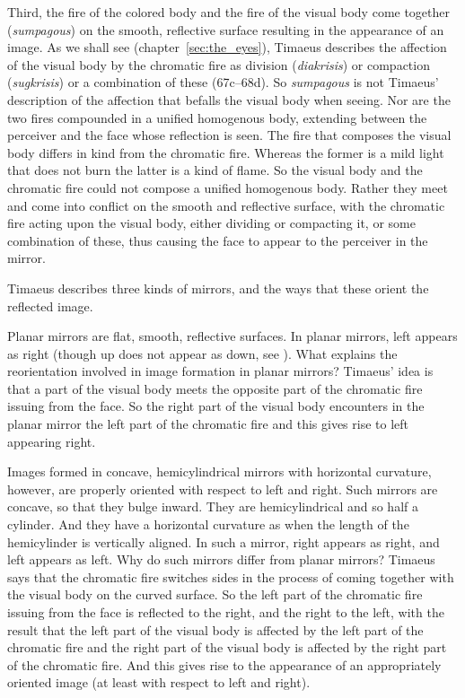 Third, the fire of the colored body and the fire of the visual body come together (\emph{sumpagous}) on the smooth, reflective surface resulting in the appearance of an image. As we shall see (chapter~\ref{sec:the_eyes}), Timaeus describes the affection of the visual body by the chromatic fire as division ({\emph{diakrisis}}) or compaction (\emph{sugkrisis}) or a combination of these (67c–68d). So \emph{sumpagous} is not Timaeus' description of the affection that befalls the visual body when seeing. Nor are the two fires compounded in a unified homogenous body, extending between the perceiver and the face whose reflection is seen. The fire that composes the visual body differs in kind from the chromatic fire. Whereas the former is a mild light that does not burn the latter is a kind of flame. So the visual body and the chromatic fire could not compose a unified homogenous body. Rather they meet and come into conflict on the smooth and reflective surface, with the chromatic fire acting upon the visual body, either dividing or compacting it, or some combination of these, thus causing the face to appear to the perceiver in the mirror.

Timaeus describes three kinds of mirrors, and the ways that these orient the reflected image.

Planar mirrors are flat, smooth, reflective surfaces. In planar mirrors, left appears as right (though up does not appear as down, see \citealt{Block:1974tk}). What explains the reorientation involved in image formation in planar mirrors? Timaeus' idea is that a part of the visual body meets the opposite part of the chromatic fire issuing from the face. So the right part of the visual body encounters in the planar mirror the left part of the chromatic fire and this gives rise to left appearing right.

Images formed in concave, hemicylindrical mirrors with horizontal curvature, however, are properly oriented with respect to left and right. Such mirrors are concave, so that they bulge inward. They are hemicylindrical and so half a cylinder. And they have a horizontal curvature as when the length of the hemicylinder is vertically aligned. In such a mirror, right appears as right, and left appears as left. Why do such mirrors differ from planar mirrors? Timaeus says that the chromatic fire switches sides in the process of coming together with the visual body on the curved surface. So the left part of the chromatic fire issuing from the face is reflected to the right, and the right to the left, with the result that the left part of the visual body is affected by the left part of the chromatic fire and the right part of the visual body is affected by the right part of the chromatic fire. And this gives rise to the appearance of an appropriately oriented image (at least with respect to left and right).

